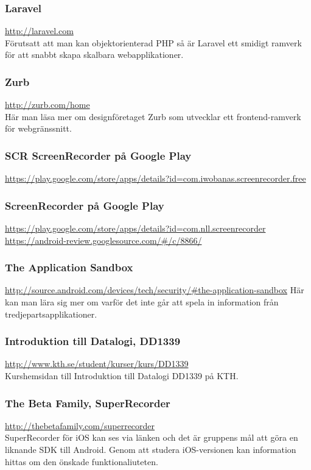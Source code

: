 \subsubsection{Laravel}
\url{http://laravel.com} \\
Förutsatt att man kan objektorienterad PHP så är Laravel ett smidigt ramverk för att snabbt skapa skalbara webapplikationer.

\subsubsection{Zurb}
\url{http://zurb.com/home} \\
Här man läsa mer om designföretaget Zurb som utvecklar ett frontend-ramverk för webgränssnitt.

\subsubsection{SCR ScreenRecorder på Google Play}
\url{https://play.google.com/store/apps/details?id=com.iwobanas.screenrecorder.free}

\subsubsection{ScreenRecorder på Google Play}
\url{https://play.google.com/store/apps/details?id=com.nll.screenrecorder}
\url{https://android-review.googlesource.com/\#/c/8866/}

\subsubsection{The Application Sandbox}
\url{http://source.android.com/devices/tech/security/\#the-application-sandbox}
Här kan man lära sig mer om varför det inte går att spela in information från tredjepartsapplikationer.

\subsubsection{Introduktion till Datalogi, DD1339}
\url{http://www.kth.se/student/kurser/kurs/DD1339} \\
Kurshemsidan till Introduktion till Datalogi DD1339 på KTH.

\subsubsection{The Beta Family, SuperRecorder}
\url{http://thebetafamily.com/superrecorder} \\
SuperRecorder för iOS kan ses via länken och det är gruppens mål att göra en liknande SDK till Android. Genom att studera iOS-versionen kan information hittas om den önskade funktionaliuteten.


